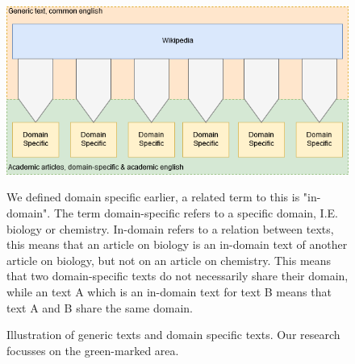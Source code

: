 \documentclass[../../Thesis.tex]{subfiles}
\begin{document}
\begin{figure}[hbt]
\includegraphics[width=6.5in]{Plots/domain_specification_graph}
\caption{Illustration of generic texts and domain specific texts. Our research focusses on the green-marked area.}\label{figure:domainPlot}
We defined domain specific earlier, a related term to this is "in-domain". The term domain-specific refers to a specific domain, I.E. biology or chemistry. In-domain refers to a relation between texts, this means that an article on biology is an in-domain text of another article on biology, but not on an article on chemistry. This means that two domain-specific texts do not necessarily share their domain, while an text A which is an in-domain text for text B means that text A and B share the same domain.
\end{figure}
\end{document}
